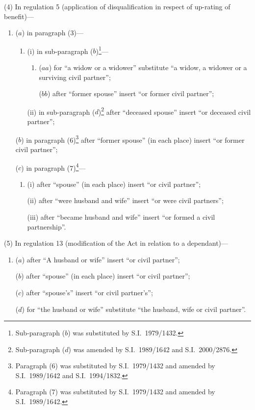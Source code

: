 \documentclass[12pt,a4paper]{article}
\begin{document}
(4) In regulation 5 (application of disqualification in respect of up-rating of benefit)—
\begin{enumerate}\item[]
($a$) in paragraph (3)—
\begin{enumerate}\item[]
(i) in sub-paragraph ($b$)\footnote{Sub-paragraph ($b$) was substituted by S.I.\ 1979/1432.}—
\begin{enumerate}\item[]
($aa$) for “a widow or a widower” substitute “a widow, a widower or a surviving civil partner”;

($bb$) after “former spouse” insert “or former civil partner”;
\end{enumerate}

(ii) in sub-paragraph ($d$)\footnote{Sub-paragraph ($d$) was amended by S.I.\ 1989/1642 and S.I.\ 2000/2876.} after “deceased spouse” insert “or deceased civil partner”;
\end{enumerate}

($b$) in paragraph (6)\footnote{Paragraph (6) was substituted by S.I.\ 1979/1432 and amended by S.I.\ 1989/1642 and S.I.\ 1994/1832.} after “former spouse” (in each place) insert “or former civil partner”;

($c$) in paragraph (7)\footnote{Paragraph (7) was substituted by S.I.\ 1979/1432 and amended by S.I.\ 1989/1642.}—
\begin{enumerate}\item[]
(i) after “spouse” (in each place) insert “or civil partner”;

(ii) after “were husband and wife” insert “or were civil partners”;

(iii) after “became husband and wife” insert “or formed a civil partnership”.
\end{enumerate}
\end{enumerate}

(5) In regulation 13 (modification of the Act in relation to a dependant)—
\begin{enumerate}\item[]
($a$) after “A husband or wife” insert “or civil partner”;

($b$) after “spouse” (in each place) insert “or civil partner”;

($c$) after “spouse's” insert “or civil partner's”;

($d$) for “the husband or wife” substitute “the husband, wife or civil partner”.
\end{enumerate}
\end{document}
